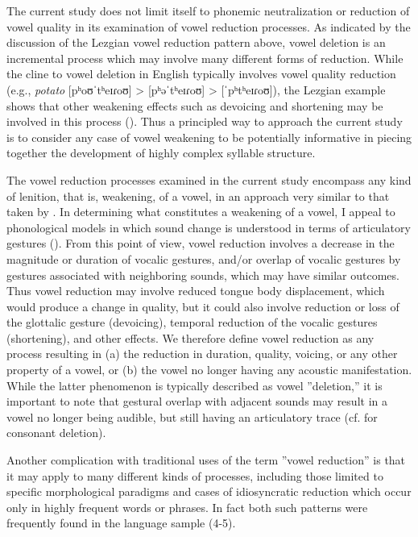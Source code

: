   The current study does not limit itself to phonemic neutralization or reduction of vowel quality in its examination of vowel reduction processes. As indicated by the discussion of the Lezgian vowel reduction pattern above, vowel deletion is an incremental process which may involve many different forms of reduction. While the cline to vowel deletion in English typically involves vowel quality reduction (e.g., \textit{potato} [pʰoʊˈtʰeɪɾoʊ] > [pʰəˈtʰeɪɾoʊ] > [ˈpʰtʰeɪɾoʊ]), the Lezgian example shows that other weakening effects such as devoicing and shortening may be involved in this process (\citealt{ChitoranBabaliyeva2007}). Thus a principled way to approach the current study is to consider any case of vowel weakening to be potentially informative in piecing together the development of highly complex syllable structure.

  The vowel reduction processes examined in the current study encompass any kind of lenition, that is, weakening, of a vowel, in an approach very similar to that taken by \citet{KapatsinskiEtAl2019}. In determining what constitutes a weakening of a vowel, I appeal to phonological models in which sound change is understood in terms of articulatory gestures (\citealt{BrowmanGoldstein1992b,MowreyPagliuca1995}). From this point of view, vowel reduction involves a decrease in the magnitude or duration of vocalic gestures, and/or overlap of vocalic gestures by gestures associated with neighboring sounds, which may have similar outcomes. Thus vowel reduction may involve reduced tongue body displacement, which would produce a change in quality, but it could also involve reduction or loss of the glottalic gesture (devoicing), temporal reduction of the vocalic gestures (shortening), and other effects. We therefore define vowel reduction as any process resulting in 
  (a) the reduction in duration, quality, voicing, or any other property of a vowel, or 
  (b) the vowel no longer having any acoustic manifestation. While the latter phenomenon is typically described as vowel ”deletion,” it is important to note that gestural overlap with adjacent sounds may result in a vowel no longer being audible, but still having an articulatory trace (cf. \citealt{BrowmanGoldstein1990} for consonant deletion).

  Another complication with traditional uses of the term ”vowel reduction” is that it may apply to many different kinds of processes, including those limited to specific morphological paradigms and cases of idiosyncratic reduction which occur only in highly frequent words or phrases. In fact both such patterns were frequently found in the language sample (4-5).

